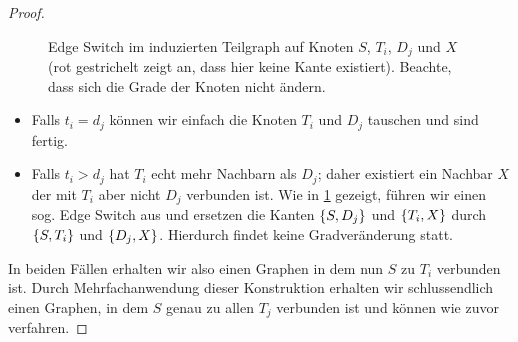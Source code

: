 \begin{proof}
\begin{figure}
\begin{center}
        \end{center}
        \caption{
            Edge Switch im induzierten Teilgraph auf Knoten $S$, $T_i$, $D_j$ und $X$
            (rot gestrichelt zeigt an, dass hier keine Kante existiert).
            Beachte, dass sich die Grade der Knoten nicht ändern.
        }
        \label{fig:hh_edge_switch}
    \end{figure}

    \begin{itemize}
        \item
              Falls $t_i = d_j$ können wir einfach die Knoten $T_i$ und $D_j$ tauschen und sind fertig.
        \item
              Falls $t_i > d_j$ hat $T_i$ echt mehr Nachbarn als $D_j$; daher existiert ein Nachbar $X$ der mit $T_i$ aber nicht $D_j$ verbunden ist.
              Wie in \cref{fig:hh_edge_switch} gezeigt, führen wir einen sog. Edge Switch aus und ersetzen die Kanten $\left\{S, D_j\right\}$ und $\left\{T_i, X\right\}$ durch $\left\{S, T_i\right\}$ und $\left\{D_j, X\right\}$.
              Hierdurch findet keine Gradveränderung statt.
    \end{itemize}

    In beiden Fällen erhalten wir also einen Graphen in dem nun $S$ zu $T_i$ verbunden ist.
    Durch Mehrfachanwendung dieser Konstruktion erhalten wir schlussendlich einen Graphen, in  dem $S$ genau zu allen $T_j$ verbunden ist und können wie zuvor verfahren.
\end{proof}

